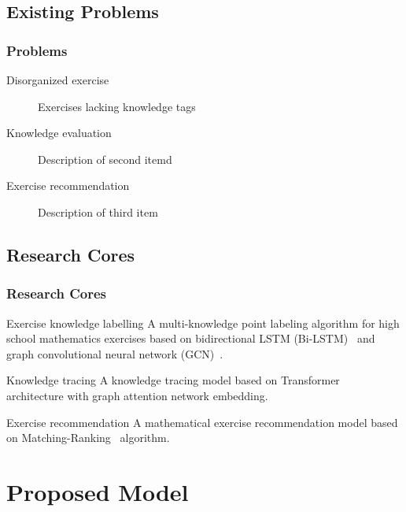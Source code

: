 \documentclass{beamer}
\begin{document}
\subsection{Existing Problems}
\begin{frame}
  \frametitle{Problems}
  \begin{description}
    \item[Disorganized exercise] Exercises lacking knowledge tags
    \item[Knowledge evaluation] Description of second itemd
    \item[Exercise recommendation] Description of third item
  \end{description}
\end{frame}
\subsection{Research Cores}
\begin{frame}
  \frametitle{Research Cores}
  \begin{block}{Exercise knowledge labelling}
    A multi-knowledge point labeling algorithm for high school mathematics exercises based on bidirectional LSTM (Bi-LSTM)~\cite{chen2017improving} and graph convolutional neural network (GCN)~\cite{kipf2016semi}.
  \end{block}
  \begin{block}{Knowledge tracing}
    A knowledge tracing model based on Transformer~\cite{vaswani2017attention} architecture with graph attention network embedding.
  \end{block}
  \begin{block}{Exercise recommendation}
    A mathematical exercise recommendation model based on Matching-Ranking~\cite{segev2009context} algorithm.
  \end{block}
\end{frame}
\section{Proposed Model}
\end{document}
